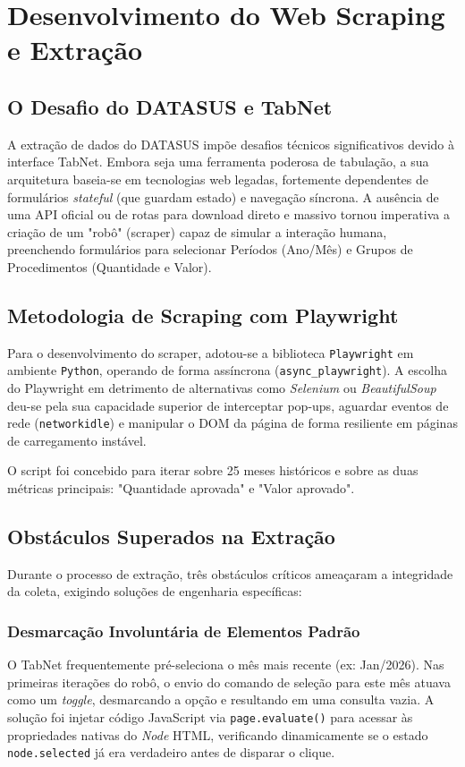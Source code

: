 \documentclass[12pt,a4paper]{report}
\begin{document}
\chapter{Desenvolvimento do Web Scraping e Extração}

\section{O Desafio do DATASUS e TabNet}
A extração de dados do DATASUS impõe desafios técnicos significativos devido à interface TabNet. Embora seja uma ferramenta poderosa de tabulação, a sua arquitetura baseia-se em tecnologias web legadas, fortemente dependentes de formulários \textit{stateful} (que guardam estado) e navegação síncrona. A ausência de uma API oficial ou de rotas para download direto e massivo tornou imperativa a criação de um "robô" (scraper) capaz de simular a interação humana, preenchendo formulários para selecionar Períodos (Ano/Mês) e Grupos de Procedimentos (Quantidade e Valor).

\section{Metodologia de Scraping com Playwright}
Para o desenvolvimento do scraper, adotou-se a biblioteca \texttt{Playwright} em ambiente \texttt{Python}, operando de forma assíncrona (\texttt{async\_playwright}). A escolha do Playwright em detrimento de alternativas como \textit{Selenium} ou \textit{BeautifulSoup} deu-se pela sua capacidade superior de interceptar pop-ups, aguardar eventos de rede (\texttt{networkidle}) e manipular o DOM da página de forma resiliente em páginas de carregamento instável.

O script foi concebido para iterar sobre 25 meses históricos e sobre as duas métricas principais: "Quantidade aprovada" e "Valor aprovado".

\section{Obstáculos Superados na Extração}

Durante o processo de extração, três obstáculos críticos ameaçaram a integridade da coleta, exigindo soluções de engenharia específicas:

\subsection{Desmarcação Involuntária de Elementos Padrão}
O TabNet frequentemente pré-seleciona o mês mais recente (ex: Jan/2026). Nas primeiras iterações do robô, o envio do comando de seleção para este mês atuava como um \textit{toggle}, desmarcando a opção e resultando em uma consulta vazia.
A solução foi injetar código JavaScript via \texttt{page.evaluate()} para acessar às propriedades nativas do \textit{Node} HTML, verificando dinamicamente se o estado \texttt{node.selected} já era verdadeiro antes de disparar o clique.
\end{document}
